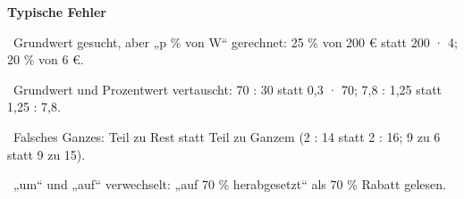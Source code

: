 \documentclass[11pt]{article}
\begin{document}
\pfheftstil
\fancyfoot[C]{\parbox[t]{\textwidth}{\mbfhbox\par\vspace{1.5mm}{\footnotesize\color{mbgrau}{\scriptsize 3Z2}\hfill\thepage}}}
{\small\noindent\textbf{Typische Fehler}\par\smallskip\noindent \textbullet\ Grundwert gesucht, aber „p \% von W“ gerechnet: 25 \% von 200 € statt 200 · 4; 20 \% von 6 €.\par\noindent \textbullet\ Grundwert und Prozentwert vertauscht: 70 : 30 statt 0,3 · 70; 7,8 : 1,25 statt 1,25 : 7,8.\par\noindent \textbullet\ Falsches Ganzes: Teil zu Rest statt Teil zu Ganzem (2 : 14 statt 2 : 16; 9 zu 6 statt 9 zu 15).\par\noindent \textbullet\ „um“ und „auf“ verwechselt: „auf 70 \% herabgesetzt“ als 70 \% Rabatt gelesen.\par}\medskip
\begin{pfloesung}{}
\end{pfloesung}
\begin{pfloesung}{}
\end{pfloesung}
\begin{pfloesung}{}
\end{pfloesung}
\begin{pfloesung}{}
\end{pfloesung}
\begin{pfloesung}{}
\end{pfloesung}
\begin{pfloesung}{}
\end{pfloesung}
\begin{pfloesung}{}
\end{pfloesung}
\begin{pfloesung}{}
\end{pfloesung}
\begin{pfloesung}{}
\end{pfloesung}
\begin{pfloesung}{}
\end{pfloesung}
\end{document}
